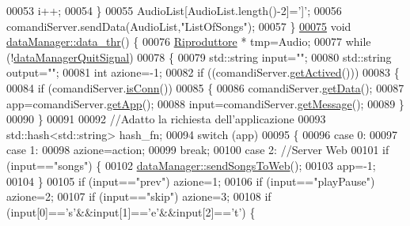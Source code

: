 \begin{DoxyCode}
00053         i++;
00054     \}
00055     AudioList[AudioList.length()-2]=\textcolor{charliteral}{']'};
00056     comandiServer.sendData(AudioList,\textcolor{stringliteral}{"ListOfSongs"});
00057 \}
\hypertarget{dataManagerHub_8cpp_source_l00075}{}\hyperlink{classdataManager_a509a1915ab57d91969f4d7075a138c2e}{00075} \textcolor{keywordtype}{void} \hyperlink{classdataManager_a509a1915ab57d91969f4d7075a138c2e}{dataManager::data_thr}() \{
00076     \hyperlink{classRiproduttore}{Riproduttore} * tmp=Audio;
00077     \textcolor{keywordflow}{while} (!\hyperlink{classdataManager_a76b9dba2dde86540f5f37f3b5840653e}{dataManagerQuitSignal})
00078     \{
00079         std::string input=\textcolor{stringliteral}{""};
00080         std::string output=\textcolor{stringliteral}{""};
00081         \textcolor{keywordtype}{int} azione=-1;
00082         \textcolor{keywordflow}{if} ((comandiServer.\hyperlink{classServer_a23b2a4e9819bd2ad2dbb6a0ccc63adc2}{getActived}()))
00083         \{
00084             \textcolor{keywordflow}{if} (comandiServer.\hyperlink{classServer_a343411b66598c4a18a85ff8ed3bc70d3}{isConn}())
00085             \{
00086                 comandiServer.\hyperlink{classServer_a212514d665699ff74c168b81303be815}{getData}();
00087                 app=comandiServer.\hyperlink{classServer_abf528e3dd8190943593c4094b20201f2}{getApp}();
00088                 input=comandiServer.\hyperlink{classServer_a968480d1fc8a455f708fdc5ec9f1e7d2}{getMessage}();
00089             \}
00090         \}
00091 
00092         \textcolor{comment}{//Adatto la richiesta dell'applicazione}
00093         std::hash<std::string> hash\_fn;
00094         \textcolor{keywordflow}{switch} (app)
00095         \{
00096         \textcolor{keywordflow}{case} 0:
00097         \textcolor{keywordflow}{case} 1:
00098             azione=action;
00099             \textcolor{keywordflow}{break};
00100         \textcolor{keywordflow}{case} 2: \textcolor{comment}{//Server Web}
00101             \textcolor{keywordflow}{if} (input==\textcolor{stringliteral}{"songs"}) \{
00102                 \hyperlink{classdataManager_a69df5746c83be0abbb051ba4bd4d96d6}{dataManager::sendSongsToWeb}();
00103                 app=-1;
00104             \}
00105             \textcolor{keywordflow}{if} (input==\textcolor{stringliteral}{"prev"}) azione=1;
00106             \textcolor{keywordflow}{if} (input==\textcolor{stringliteral}{"playPause"}) azione=2;
00107             \textcolor{keywordflow}{if} (input==\textcolor{stringliteral}{"skip"}) azione=3;
00108             \textcolor{keywordflow}{if} (input[0]==\textcolor{charliteral}{'s'}&&input[1]==\textcolor{charliteral}{'e'}&&input[2]==\textcolor{charliteral}{'t'}) \{

\end{DoxyCode}
